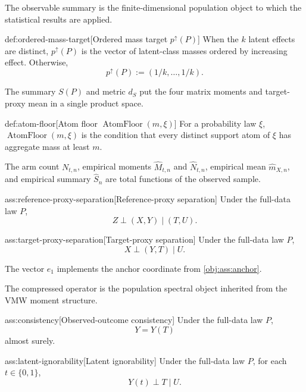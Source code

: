 The observable summary is the finite-dimensional population object to which the statistical results are applied.

\begin{definitionv}{def:ordered-mass-target}[Ordered mass target \(p^{\uparrow}(P)\)]
When the \(k\) latent effects are distinct, \(p^{\uparrow}(P)\) is the vector of latent-class masses ordered by increasing effect. Otherwise,
\[
p^{\uparrow}(P) := (1/k,\ldots,1/k).
\]
\end{definitionv}

The summary \(S(P)\) and metric \(d_S\) put the four matrix moments and target-proxy mean in a single product space.

\begin{definitionv}{def:atom-floor}[Atom floor \(\operatorname{AtomFloor}(m,\xi)\)]
For a probability law \(\xi\), \(\operatorname{AtomFloor}(m,\xi)\) is the condition that every distinct support atom of \(\xi\) has aggregate mass at least \(m\).
\end{definitionv}

The arm count \(N_{t,n}\), empirical moments \(\widehat M_{t,n}\) and \(\widehat N_{t,n}\), empirical mean \(\widehat m_{X,n}\), and empirical summary \(\widehat S_n\) are total functions of the observed sample.

\begin{assumptionv}{ass:reference-proxy-separation}[Reference-proxy separation]
Under the full-data law \(P\),
\[
Z\perp (X,Y)\mid (T,U).
\]
\end{assumptionv}

\begin{assumptionv}{ass:target-proxy-separation}[Target-proxy separation]
Under the full-data law \(P\),
\[
X\perp (Y,T)\mid U.
\]
\end{assumptionv}

The vector \(e_1\) implements the anchor coordinate from \cref{obj:ass:anchor}.

The compressed operator is the population spectral object inherited from the VMW moment structure.

\begin{assumptionv}{ass:consistency}[Observed-outcome consistency]
Under the full-data law \(P\),
\[
Y=Y(T)
\]
almost surely.
\end{assumptionv}

\begin{assumptionv}{ass:latent-ignorability}[Latent ignorability]
Under the full-data law \(P\), for each \(t\in\{0,1\}\),
\[
Y(t)\perp T\mid U.
\]
\end{assumptionv}

